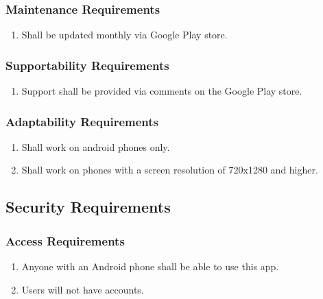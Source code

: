 \documentclass[]{article}
\begin{document}
\begin{enumerate}[{VP}1.]
\subsubsection{Maintenance Requirements}
\label{ssub:maintenance_requirements}
\begin{enumerate}[{MS}1. ]
	\item Shall be updated monthly via Google Play store.
\end{enumerate}

\subsubsection{Supportability Requirements}
\label{ssub:supportability_requirements}
\begin{enumerate}[{MS}1. ]
	\item Support shall be provided via comments on the Google Play store.
\end{enumerate}

\subsubsection{Adaptability Requirements}
\label{ssub:adaptability_requirements}
\begin{enumerate}[{MS}1. ]
	\item Shall work on android phones only.
	\item Shall work on phones with a screen resolution of 720x1280 and higher.
\end{enumerate}


\subsection{Security Requirements}
\label{sub:security_requirements}

\subsubsection{Access Requirements}
\label{ssub:access_requirements}
\begin{enumerate}[{SR}1. ]
	\item Anyone with an Android phone shall be able to use this app.
	\item Users will not have accounts.
\end{enumerate}


\end{enumerate}
\end{document}
